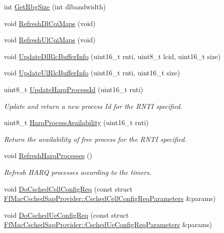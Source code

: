 \begin{DoxyCompactItemize}
\item 
int \hyperlink{classns3_1_1RrFfMacScheduler_a65de621ce59a64d6b0a3a56c3904470a}{Get\+Rbg\+Size} (int dlbandwidth)
\item 
void \hyperlink{classns3_1_1RrFfMacScheduler_a537ddfed33bced7f9a5762128e025ece}{Refresh\+Dl\+Cqi\+Maps} (void)
\item 
void \hyperlink{classns3_1_1RrFfMacScheduler_ab28ac1b62c16252bfff55825dfbcd701}{Refresh\+Ul\+Cqi\+Maps} (void)
\item 
void \hyperlink{classns3_1_1RrFfMacScheduler_a579580e9727897effc77801086e413ab}{Update\+Dl\+Rlc\+Buffer\+Info} (uint16\+\_\+t rnti, uint8\+\_\+t lcid, uint16\+\_\+t size)
\item 
void \hyperlink{classns3_1_1RrFfMacScheduler_afb35721c4c54c4114e5aeb4cf03ff175}{Update\+Ul\+Rlc\+Buffer\+Info} (uint16\+\_\+t rnti, uint16\+\_\+t size)
\item 
uint8\+\_\+t \hyperlink{classns3_1_1RrFfMacScheduler_a4578e84d57b9602408f7a3af95ef152c}{Update\+Harq\+Process\+Id} (uint16\+\_\+t rnti)
\begin{DoxyCompactList}\small\item\em Update and return a new process Id for the R\+N\+TI specified. \end{DoxyCompactList}\item 
uint8\+\_\+t \hyperlink{classns3_1_1RrFfMacScheduler_af764ce5bbe2c2e0843064779816f1bc0}{Harq\+Process\+Availability} (uint16\+\_\+t rnti)
\begin{DoxyCompactList}\small\item\em Return the availability of free process for the R\+N\+TI specified. \end{DoxyCompactList}\item 
void \hyperlink{classns3_1_1RrFfMacScheduler_a8489330ad94640e0d432db6f11156d43}{Refresh\+Harq\+Processes} ()
\begin{DoxyCompactList}\small\item\em Refresh H\+A\+RQ processes according to the timers. \end{DoxyCompactList}\item 
void \hyperlink{classns3_1_1RrFfMacScheduler_ab72bbfd5677f4f23b78c27593e2645ef}{Do\+Csched\+Cell\+Config\+Req} (const struct \hyperlink{structns3_1_1FfMacCschedSapProvider_1_1CschedCellConfigReqParameters}{Ff\+Mac\+Csched\+Sap\+Provider\+::\+Csched\+Cell\+Config\+Req\+Parameters} \&params)
\item 
void \hyperlink{classns3_1_1RrFfMacScheduler_af08183e3fbf6006b4f39abf02049f77a}{Do\+Csched\+Ue\+Config\+Req} (const struct \hyperlink{structns3_1_1FfMacCschedSapProvider_1_1CschedUeConfigReqParameters}{Ff\+Mac\+Csched\+Sap\+Provider\+::\+Csched\+Ue\+Config\+Req\+Parameters} \&params)

\end{DoxyCompactItemize}
